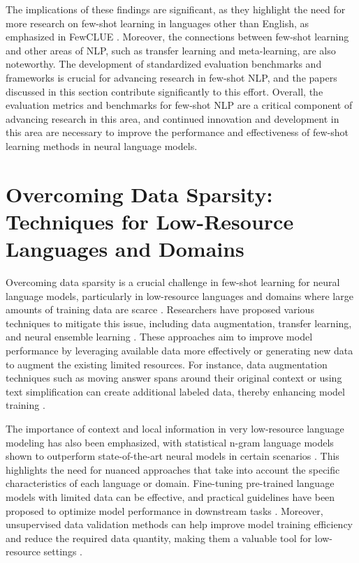 \documentclass[conference]{IEEEtran}
\begin{document}
The implications of these findings are significant, as they highlight the need for more research on few-shot learning in languages other than English, as emphasized in FewCLUE \cite{b5}. Moreover, the connections between few-shot learning and other areas of NLP, such as transfer learning and meta-learning, are also noteworthy. The development of standardized evaluation benchmarks and frameworks is crucial for advancing research in few-shot NLP, and the papers discussed in this section contribute significantly to this effort. Overall, the evaluation metrics and benchmarks for few-shot NLP are a critical component of advancing research in this area, and continued innovation and development in this area are necessary to improve the performance and effectiveness of few-shot learning methods in neural language models.

\section{Overcoming Data Sparsity: Techniques for Low-Resource Languages and Domains}
Overcoming data sparsity is a crucial challenge in few-shot learning for neural language models, particularly in low-resource languages and domains where large amounts of training data are scarce \cite{b1}. Researchers have proposed various techniques to mitigate this issue, including data augmentation, transfer learning, and neural ensemble learning \cite{b2}. These approaches aim to improve model performance by leveraging available data more effectively or generating new data to augment the existing limited resources. For instance, data augmentation techniques such as moving answer spans around their original context or using text simplification can create additional labeled data, thereby enhancing model training \cite{b2}.

The importance of context and local information in very low-resource language modeling has also been emphasized, with statistical n-gram language models shown to outperform state-of-the-art neural models in certain scenarios \cite{b3}. This highlights the need for nuanced approaches that take into account the specific characteristics of each language or domain. Fine-tuning pre-trained language models with limited data can be effective, and practical guidelines have been proposed to optimize model performance in downstream tasks \cite{b4}. Moreover, unsupervised data validation methods can help improve model training efficiency and reduce the required data quantity, making them a valuable tool for low-resource settings \cite{b5}.
\end{document}
